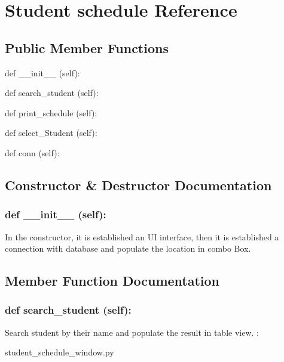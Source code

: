 \hypertarget{Student_schedule}{\section{Student schedule Reference}
\label{Student_schedule}
}
\subsection*{Public Member Functions}
\begin{DoxyCompactItemize}
\item 
def {\_\_init\_\_} (self):
\item 
def {search\_student} (self):
\item 
def {print\_schedule} (self):
\item 
def {select\_Student} (self):
\item 
def {conn} (self):
\end{DoxyCompactItemize}

\subsection{Constructor \& Destructor Documentation}
\hypertarget{class_poly_aa3def076b74bed67904976ad4f9fe9b1}{
\subsubsection[{def __init__ (self):}]{\setlength{\rightskip}{0pt plus 5cm}def {\_\_init\_\_} (self): 
}}
In the constructor, it is established an UI interface, then it is  established a connection with database and populate the location in combo Box.
 

\subsection{Member Function Documentation}
\hypertarget{class_poly_a14a7ad77ce612b0c54f531d307ee4b39}{
\subsubsection[{def search_student (self):}]{\setlength{\rightskip}{0pt plus 5cm}def {search\_student} (self):}}\label{class_poly_a14a7ad77ce612b0c54f531d307ee4b39}
Search student by their name and populate the result in table view.
:\begin{DoxyCompactItemize}
\item 
student\_schedule\_window.\-py\end{DoxyCompactItemize}

